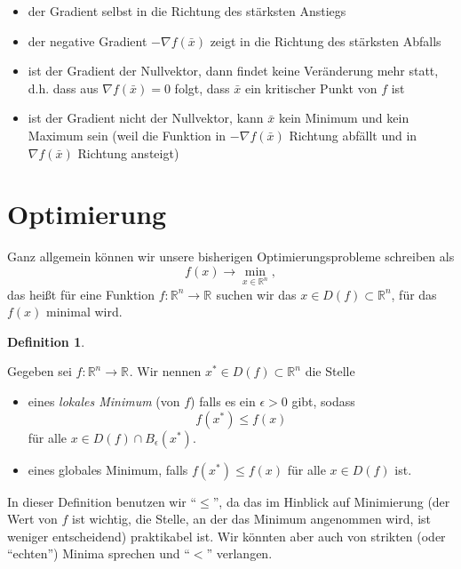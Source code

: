 \documentclass[]{book}
\providecommand{\tightlist}{%
  \setlength{\itemsep}{0pt}\setlength{\parskip}{0pt}}
\theoremstyle{definition}
\newtheorem{definition}{Definition}[chapter]
\theoremstyle{definition}
\theoremstyle{definition}
\theoremstyle{definition}
\theoremstyle{remark}
\begin{document}
\begin{itemize}
\tightlist
\item
  der Gradient selbst in die Richtung des stärksten Anstiegs
\item
  der negative Gradient \(-\nabla f(\bar x)\) zeigt in die Richtung des stärksten Abfalls
\item
  ist der Gradient der Nullvektor, dann findet keine Veränderung mehr statt, d.h. dass aus \(\nabla f(\bar x) =0\) folgt, dass \(\bar x\) ein kritischer Punkt von \(f\) ist
\item
  ist der Gradient nicht der Nullvektor, kann \(\bar x\) kein Minimum und kein Maximum sein (weil die Funktion in \(-\nabla f(\bar x)\) Richtung abfällt und in \(\nabla f(\bar x)\) Richtung ansteigt)
\end{itemize}

\hypertarget{optimierung-1}{%
\section{Optimierung}\label{optimierung-1}}

Ganz allgemein können wir unsere bisherigen Optimierungsprobleme schreiben als
\begin{equation*}
f(x) \to \min_{x\in \mathbb R^{n}},
\end{equation*}
das heißt für eine Funktion \(f\colon \mathbb R^n \to \mathbb R^{}\) suchen wir das \(x \in D(f) \subset \mathbb R^{n}\), für das \(f(x)\) minimal wird.

\begin{definition}
\protect\hypertarget{def:loc-glob-minimum}{}\label{def:loc-glob-minimum}

Gegeben sei \(f\colon \mathbb R^{n} \to \mathbb R^{}\). Wir nennen \(x^* \in D(f)\subset \mathbb R^{n}\) die Stelle

\begin{itemize}
\item
  eines \emph{lokales Minimum} (von \(f\)) falls es ein \(\epsilon >0\) gibt, sodass
  \begin{equation*}
  f(x^*) \leq f(x)
  \end{equation*}
  für alle \(x \in D(f) \cap B_\epsilon (x^*)\).
\item
  eines globales Minimum, falls \(f(x^*) \leq f(x)\) für alle \(x\in D(f)\) ist.
\end{itemize}

\end{definition}

In dieser Definition benutzen wir ``\(\leq\)'', da das im Hinblick auf Minimierung (der Wert von \(f\) ist wichtig, die Stelle, an der das Minimum angenommen wird, ist weniger entscheidend) praktikabel ist. Wir könnten aber auch von strikten (oder ``echten'') Minima sprechen und ``\(<\)'' verlangen.
\end{document}
